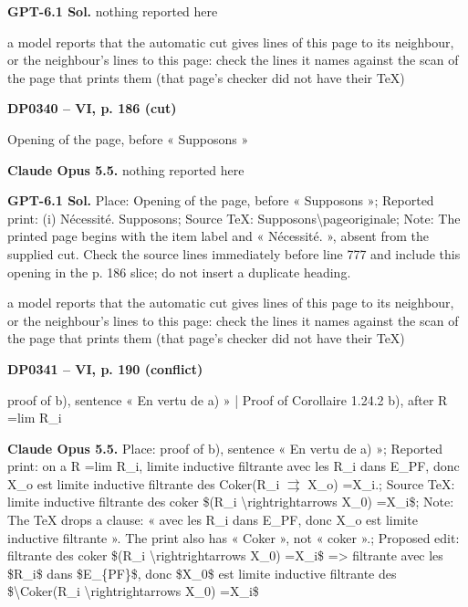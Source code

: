 \textbf{GPT-6.1 Sol.} nothing reported here\par
a model reports that the automatic cut gives lines of this page to its neighbour, or the neighbour's lines to this page: check the lines it names against the scan of the page that prints them (that page's checker did not have their TeX)\par
\par\noindent\hypertarget{DP0340}{}\textbf{DP0340 -- VI, p. 186 (cut)}\par
Opening of the page, before « Supposons »\par
\textbf{Claude Opus 5.5.} nothing reported here\par
\textbf{GPT-6.1 Sol.} Place: Opening of the page, before « Supposons »; Reported print: (i) Nécessité. Supposons; Source TeX: Supposons\textbackslash{}pageoriginale; Note: The printed page begins with the item label and « Nécessité. », absent from the supplied cut. Check the source lines immediately before line 777 and include this opening in the p. 186 slice; do not insert a duplicate heading.\par
a model reports that the automatic cut gives lines of this page to its neighbour, or the neighbour's lines to this page: check the lines it names against the scan of the page that prints them (that page's checker did not have their TeX)\par
\par\noindent\hypertarget{DP0341}{}\textbf{DP0341 -- VI, p. 190 (conflict)}\par
proof of b), sentence « En vertu de a) » | Proof of Corollaire 1.24.2 b), after R =\allowbreak  lim R\_i\par
\textbf{Claude Opus 5.5.} Place: proof of b), sentence « En vertu de a) »; Reported print: on a R =\allowbreak  lim R\_i, limite inductive filtrante avec les R\_i dans E\_PF, donc X\_o est limite inductive filtrante des Coker(R\_i \ensuremath{\rightrightarrows} X\_o) =\allowbreak  X\_i.; Source TeX: limite inductive filtrante des coker \$(R\_i \textbackslash{}rightrightarrows X\_0) =\allowbreak  X\_i\$; Note: The TeX drops a clause: « avec les R\_i dans E\_PF, donc X\_o est limite inductive filtrante ». The print also has « Coker », not « coker ».; Proposed edit: filtrante des coker \$(R\_i \textbackslash{}rightrightarrows X\_0) =\allowbreak  X\_i\$ =\allowbreak > filtrante avec les \$R\_i\$ dans \$E\_\{PF\}\$, donc \$X\_0\$ est limite inductive filtrante des \$\textbackslash{}Coker(R\_i \textbackslash{}rightrightarrows X\_0) =\allowbreak  X\_i\$\par
